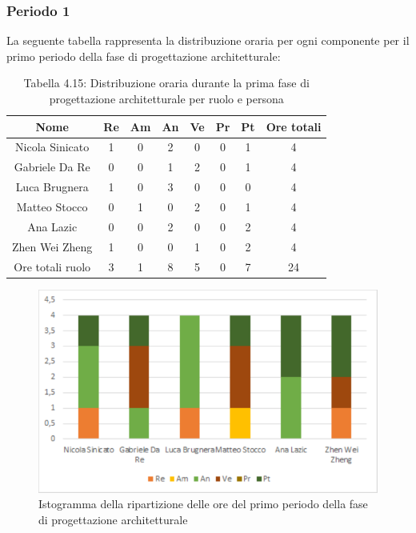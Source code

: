 \subsubsection{Periodo 1}
%
La seguente tabella rappresenta la distribuzione oraria per ogni componente per il primo periodo della fase di progettazione architetturale:
\begin{table}[h]
	\setlength\extrarowheight{5pt}
	\centering
	\begin{tabularx}{\textwidth}{|ccccccc|c|}
		\hline
		\rowcolor{white}
		\textbf{Nome} & \textbf{Re} & \textbf{Am} & \textbf{An} & \textbf{Ve} & \textbf{Pr}& \textbf{Pt} & \textbf{Ore totali} \\
		\hline
		Nicola Sinicato &1&0&2&0&0&1&4 \\
		Gabriele Da Re &0&0&1&2&0&1&4 \\
		Luca Brugnera &1&0&3&0&0&0&4 \\
		Matteo Stocco &0&1&0&2&0&1&4 \\
		Ana Lazic &0&0&2&0&0&2&4 \\
		Zhen Wei Zheng &1&0&0&1&0&2&4 \\
		\hline
		Ore totali ruolo &3&1&8&5&0&7&24 \\
		\hline
	\end{tabularx}
	\vspace{10pt}
	\caption{Tabella 4.15: Distribuzione oraria durante la prima fase di progettazione architetturale per ruolo e persona}
\end{table}
\begin{figure}[H]
    \centering
    \includegraphics[scale=0.6]{img/grafi preventivo/istogrammi/architetturale/periodo1.png}
    \caption{Istogramma della ripartizione delle ore del primo periodo della fase di progettazione architetturale}
\end{figure}
